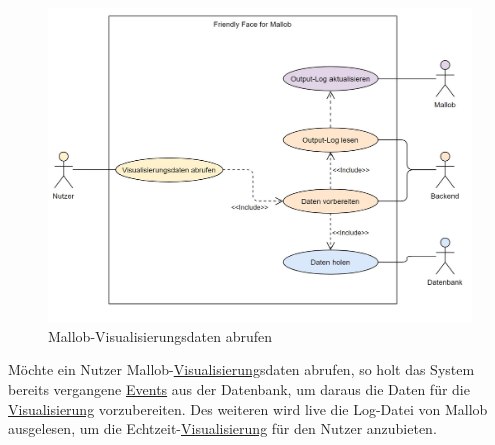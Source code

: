 \begin{figure}[H]
    \centering
    \includegraphics[width=\textwidth]{images-interface/usecasediagrams/Usecasediagram_Mallob-Visualisierungsdaten_abrufen.jpg}
    \caption{\gls{Mallob}-Visualisierungsdaten abrufen}
\end{figure}
Möchte ein \gls{Nutzer} \gls{Mallob}-\hyperref[pages:visualization]{Visualisierung}sdaten abrufen, so holt das System bereits vergangene \hyperref[B:Event]{Events} aus der \gls{Datenbank}, um daraus die Daten für die \hyperref[pages:visualization]{Visualisierung} vorzubereiten. Des weiteren wird live die \gls{Log-Datei} von \gls{Mallob} ausgelesen, um die Echtzeit-\hyperref[pages:visualization]{Visualisierung} für den \gls{Nutzer} anzubieten. 


\pagebreak

